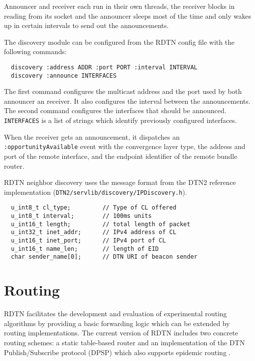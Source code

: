 \documentclass{article}
\begin{document}
Announcer and receiver each run in their own threads, the receiver blocks in
reading from its socket and the announcer sleeps most of the time and
only wakes up in certain intervals to send out the announcements.

The discovery module can be configured from the RDTN config file with the
following commands:

\begin{verbatim}
  discovery :address ADDR :port PORT :interval INTERVAL
  discovery :announce INTERFACES
\end{verbatim}

The first command configures the multicast address and the port used by both
announcer an receiver. It also configures the interval between the
announcements.  The second command configures the interfaces that should be
announced.  {\tt INTERFACES} is a list of strings which identify previously
configured interfaces.

When the receiver gets an announcement, it dispatches an {\tt
:opportunityAvailable} event with the convergence layer type, the address and
port of the remote interface, and the endpoint identifier of the remote bundle
router.

RDTN neighbor discovery uses the message format from the DTN2 reference
implementation ({\tt DTN2/servlib/discovery/IPDiscovery.h}).

\begin{verbatim}
  u_int8_t cl_type;         // Type of CL offered
  u_int8_t interval;        // 100ms units
  u_int16_t length;         // total length of packet
  u_int32_t inet_addr;      // IPv4 address of CL
  u_int16_t inet_port;      // IPv4 port of CL
  u_int16_t name_len;       // length of EID
  char sender_name[0];      // DTN URI of beacon sender
\end{verbatim}

\section{Routing}\label{sec.routing}

RDTN facilitates the development and evaluation of experimental routing
algorithms by providing a basic forwarding logic which can be extended by
routing implementations. The current version of RDTN includes two concrete
routing schemes: a static table-based router and an implementation of the DTN
Publish/Subscribe protocol (DPSP) \cite{dtn-pubsub} which also supports epidemic
routing \cite{epidemic}.
\end{document}
